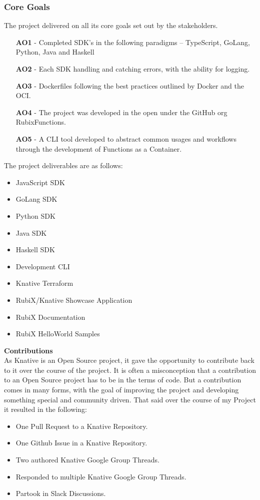 \subsubsection{Core Goals}
The project delivered on all its core goals set out by the stakeholders.
\begin{itemize}
    \item [\textbf{AO1}] - Completed SDK's in the following paradigms -- TypeScript, GoLang, Python, Java and Haskell
    \item [\textbf{AO2}] - Each SDK handling and catching errors, with the ability for logging.
    \item [\textbf{AO3}] - Dockerfiles following the best practices outlined by Docker and the OCI.
    \item [\textbf{AO4}] - The project was developed in the open under the GitHub org RubixFunctions.
    \item [\textbf{AO5}] - A CLI tool developed to abstract common usages and workflows through the development of Functions as a Container.
\end{itemize}
The project deliverables are as follows:
\begin{itemize}
    \item JavaScript SDK
    \item GoLang SDK
    \item Python SDK
    \item Java SDK
    \item Haskell SDK
    \item Development CLI
    \item Knative Terraform
    \item RubiX/Knative Showcase Application
    \item RubiX Documentation
    \item RubiX HelloWorld Samples
\end{itemize}
\textbf{Contributions}
\\As Knative is an Open Source project, it gave the opportunity to contribute back to it over the course of the project. It is often a misconception that a contribution to an Open Source project has to be in the terms of code. But a contribution comes in many forms, with the goal of improving the project and developing something special and community driven.
That said over the course of my Project it resulted in the following:
\begin{itemize}
    \item One Pull Request to a Knative Repository.
    \item One Github Issue in a Knative Repository.
    \item Two authored Knative Google Group Threads.
    \item Responded to multiple Knative Google Group Threads.
    \item Partook in Slack Discussions.
\end{itemize}

